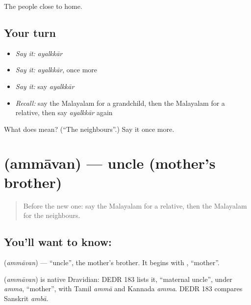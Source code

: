 \begin{grammarlens}[title={What you've built}]
The people close to home.
\end{grammarlens}

\subsection*{Your turn}
\begin{itemize}
\raggedright
  \item \emph{Say it:} \emph{ayalkkār}
  \item \emph{Say it:} \emph{ayalkkār}, once more
  \item \emph{Say it:} say \emph{ayalkkār}
  \item \emph{Recall:} say the Malayalam for a grandchild, then the Malayalam for a relative, then say \emph{ayalkkār} again
\end{itemize}

\begin{tcolorbox}[breakable,colback=teal!4,colframe=teal!35!black,title={Before you move on}]
What does  mean? (\textquotedblleft{}The neighbours\textquotedblright{}.) Say it once more.
\end{tcolorbox}
\section[\texorpdfstring{\ml{അമ്മാവൻ} (ammāvan)}{അമ്മാവൻ (ammāvan)}]{ (ammāvan) — uncle (mother's brother)}

\label{lesson:ML-C125-uncle}



\begin{quote}
Before the new one: say the Malayalam for a relative, then the Malayalam for the neighbours.
\end{quote}

\subsection*{You'll want to know: }
\textbf{} (\emph{ammāvan}) — \textquotedblleft{}uncle\textquotedblright{}, the mother's brother. It begins with \textbf{}, \textquotedblleft{}mother\textquotedblright{}.

\begin{cousinweb}
\textbf{} (\emph{ammāvan}) is native Dravidian: DEDR 183 lists it, \textquotedblleft{}maternal uncle\textquotedblright{}, under \emph{amma}, \textquotedblleft{}mother\textquotedblright{}, with Tamil \emph{ammā} and Kannada \emph{amma}. DEDR 183 compares Sanskrit \emph{ambā}.
\end{cousinweb}

